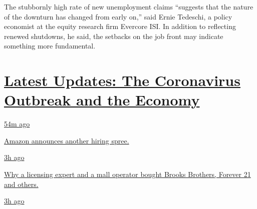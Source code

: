 The stubbornly high rate of new unemployment claims ``suggests that the
nature of the downturn has changed from early on,'' said Ernie Tedeschi,
a policy economist at the equity research firm Evercore ISI. In addition
to reflecting renewed shutdowns, he said, the setbacks on the job front
may indicate something more fundamental.

\hypertarget{latest-updates-the-coronavirus-outbreak-and-the-economy}{%
\section{\texorpdfstring{\href{https://www.nytimes3xbfgragh.onion/live/2020/09/09/business/stock-market-today-coronavirus?action=click\&pgtype=Article\&state=default\&region=MAIN_CONTENT_1\&context=storylines_live_updates}{Latest
Updates: The Coronavirus Outbreak and the
Economy}}{Latest Updates: The Coronavirus Outbreak and the Economy}}\label{latest-updates-the-coronavirus-outbreak-and-the-economy}}

\href{https://www.nytimes3xbfgragh.onion/live/2020/09/09/business/stock-market-today-coronavirus?action=click\&pgtype=Article\&state=default\&region=MAIN_CONTENT_1\&context=storylines_live_updates\#amazon-announces-another-hiring-spree}{54m
ago}

\href{https://www.nytimes3xbfgragh.onion/live/2020/09/09/business/stock-market-today-coronavirus?action=click\&pgtype=Article\&state=default\&region=MAIN_CONTENT_1\&context=storylines_live_updates\#amazon-announces-another-hiring-spree}{Amazon
announces another hiring spree.}

\href{https://www.nytimes3xbfgragh.onion/live/2020/09/09/business/stock-market-today-coronavirus?action=click\&pgtype=Article\&state=default\&region=MAIN_CONTENT_1\&context=storylines_live_updates\#why-a-licensing-expert-and-a-mall-operator-bought-brooks-brothers-forever-21-and-others}{3h
ago}

\href{https://www.nytimes3xbfgragh.onion/live/2020/09/09/business/stock-market-today-coronavirus?action=click\&pgtype=Article\&state=default\&region=MAIN_CONTENT_1\&context=storylines_live_updates\#why-a-licensing-expert-and-a-mall-operator-bought-brooks-brothers-forever-21-and-others}{Why
a licensing expert and a mall operator bought Brooks Brothers, Forever
21 and others.}

\href{https://www.nytimes3xbfgragh.onion/live/2020/09/09/business/stock-market-today-coronavirus?action=click\&pgtype=Article\&state=default\&region=MAIN_CONTENT_1\&context=storylines_live_updates\#lvmh-says-it-is-pulling-out-of-its-16-billion-takeover-of-tiffany}{3h
ago}

